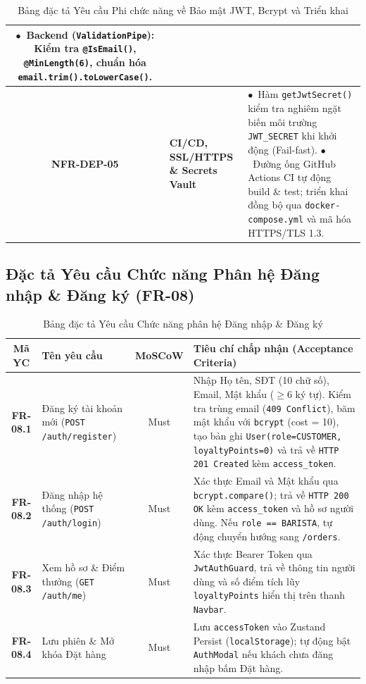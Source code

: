 \documentclass[a4paper]{article}
\begin{document}
\begin{table}[H]
\begin{tabularx}{\textwidth}{|c|p{3.2cm}|X|}
$\bullet$~Backend (\texttt{ValidationPipe}): Kiểm tra \texttt{@IsEmail()}, \texttt{@MinLength(6)}, chuẩn hóa \texttt{email.trim().toLowerCase()}. \\ \hline
\textbf{NFR-DEP-05} & \textbf{CI/CD, SSL/HTTPS \& Secrets Vault} & 
$\bullet$~Hàm \texttt{getJwtSecret()} kiểm tra nghiêm ngặt biến môi trường \texttt{JWT\_SECRET} khi khởi động (Fail-fast). \newline
$\bullet$~Đường ống GitHub Actions CI tự động build \& test; triển khai đồng bộ qua \texttt{docker-compose.yml} và mã hóa HTTPS/TLS 1.3. \\ \hline
\end{tabularx}
\caption{Bảng đặc tả Yêu cầu Phi chức năng về Bảo mật JWT, Bcrypt và Triển khai}
\label{tab:nfr_auth}
\end{table}

\subsection{Đặc tả Yêu cầu Chức năng Phân hệ Đăng nhập \& Đăng ký (FR-08)}
\begin{table}[H]
\centering
\small
\begin{tabularx}{\textwidth}{|c|p{3.4cm}|c|X|}
\hline
\textbf{Mã YC} & \textbf{Tên yêu cầu} & \textbf{MoSCoW} & \textbf{Tiêu chí chấp nhận (Acceptance Criteria)} \\ \hline
\textbf{FR-08.1} & Đăng ký tài khoản mới (\texttt{POST /auth/register}) & Must & Nhập Họ tên, SĐT (10 chữ số), Email, Mật khẩu ($\ge 6$ ký tự). Kiểm tra trùng email (\texttt{409 Conflict}), băm mật khẩu với \texttt{bcrypt} (cost = 10), tạo bản ghi \texttt{User(role=CUSTOMER, loyaltyPoints=0)} và trả về \texttt{HTTP 201 Created} kèm \texttt{access\_token}. \\ \hline
\textbf{FR-08.2} & Đăng nhập hệ thống (\texttt{POST /auth/login}) & Must & Xác thực Email và Mật khẩu qua \texttt{bcrypt.compare()}; trả về \texttt{HTTP 200 OK} kèm \texttt{access\_token} và hồ sơ người dùng. Nếu \texttt{role == BARISTA}, tự động chuyển hướng sang \texttt{/orders}. \\ \hline
\textbf{FR-08.3} & Xem hồ sơ \& Điểm thưởng (\texttt{GET /auth/me}) & Must & Xác thực Bearer Token qua \texttt{JwtAuthGuard}, trả về thông tin người dùng và số điểm tích lũy \texttt{loyaltyPoints} hiển thị trên thanh \texttt{Navbar}. \\ \hline
\textbf{FR-08.4} & Lưu phiên \& Mở khóa Đặt hàng & Must & Lưu \texttt{accessToken} vào Zustand Persist (\texttt{localStorage}); tự động bật \texttt{AuthModal} nếu khách chưa đăng nhập bấm Đặt hàng. \\ \hline
\end{tabularx}
\caption{Bảng đặc tả Yêu cầu Chức năng phân hệ Đăng nhập \& Đăng ký}
\label{tab:fr_auth}
\end{table}
\end{document}
